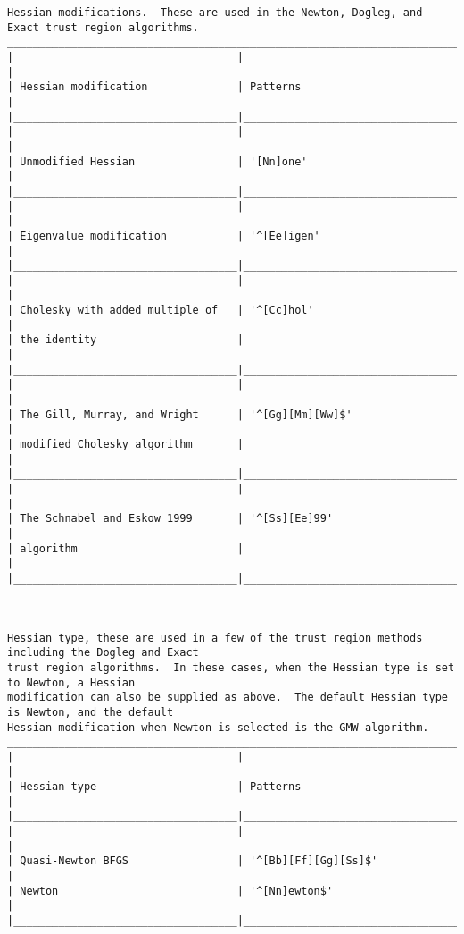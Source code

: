\begin{verbatim}
Hessian modifications.  These are used in the Newton, Dogleg, and Exact trust region algorithms.
___________________________________________________________________________________________
|                                   |                                                     |
| Hessian modification              | Patterns                                            |
|___________________________________|_____________________________________________________|
|                                   |                                                     |
| Unmodified Hessian                | '[Nn]one'                                           |
|___________________________________|_____________________________________________________|
|                                   |                                                     |
| Eigenvalue modification           | '^[Ee]igen'                                         |
|___________________________________|_____________________________________________________|
|                                   |                                                     |
| Cholesky with added multiple of   | '^[Cc]hol'                                          |
| the identity                      |                                                     |
|___________________________________|_____________________________________________________|
|                                   |                                                     |
| The Gill, Murray, and Wright      | '^[Gg][Mm][Ww]$'                                    |
| modified Cholesky algorithm       |                                                     |
|___________________________________|_____________________________________________________|
|                                   |                                                     |
| The Schnabel and Eskow 1999       | '^[Ss][Ee]99'                                       |
| algorithm                         |                                                     |
|___________________________________|_____________________________________________________|



Hessian type, these are used in a few of the trust region methods including the Dogleg and Exact
trust region algorithms.  In these cases, when the Hessian type is set to Newton, a Hessian
modification can also be supplied as above.  The default Hessian type is Newton, and the default
Hessian modification when Newton is selected is the GMW algorithm.
___________________________________________________________________________________________
|                                   |                                                     |
| Hessian type                      | Patterns                                            |
|___________________________________|_____________________________________________________|
|                                   |                                                     |
| Quasi-Newton BFGS                 | '^[Bb][Ff][Gg][Ss]$'                                |
| Newton                            | '^[Nn]ewton$'                                       |
|___________________________________|_____________________________________________________|



\end{verbatim}
